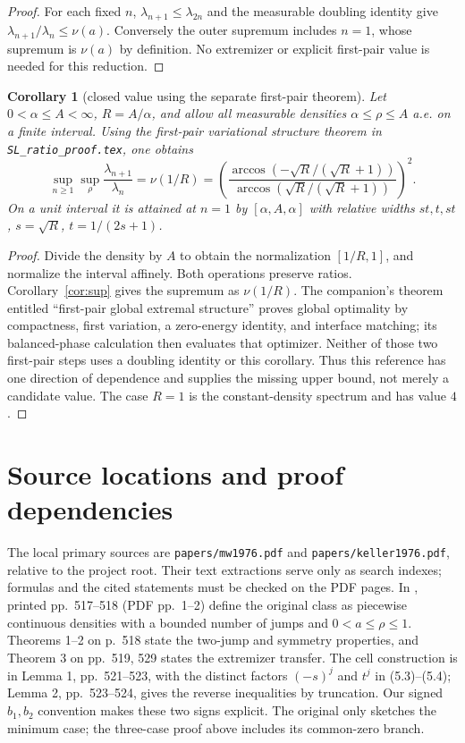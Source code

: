 ﻿\documentclass[11pt]{article}
\newtheorem{corollary}[theorem]{Corollary}
\begin{document}
\begin{proof}
 For each fixed $n$, $\lambda_{n+1}\le\lambda_{2n}$ and the measurable
 doubling identity give $\lambda_{n+1}/\lambda_n\le\nu(a)$.
 Conversely the outer supremum includes $n=1$, whose supremum is
 $\nu(a)$ by definition. No extremizer or explicit first-pair value is
 needed for this reduction.
\end{proof}

\begin{corollary}[closed value using the separate first-pair theorem]\label{cor:closed}
 Let $0<\alpha\le A<\infty$, $R=A/\alpha$, and allow all measurable
 densities $\alpha\le\rho\le A$ a.e. on a finite interval.
 Using the first-pair variational structure theorem in
 \texttt{SL\_ratio\_proof.tex}, one obtains
 \[
 \sup_{n\ge1}\sup_\rho\frac{\lambda_{n+1}}{\lambda_n}
 =\nu(1/R)
 =\left(\frac{\arccos(-\sqrt R/(\sqrt R+1))}
 {\arccos(\sqrt R/(\sqrt R+1))}\right)^2.
 \]
 On a unit interval it is attained at $n=1$ by $[\alpha,A,\alpha]$
 with relative widths $st,t,st$, $s=\sqrt R$, $t=1/(2s+1)$.
\end{corollary}

\begin{proof}
 Divide the density by $A$ to obtain the normalization $[1/R,1]$,
 and normalize the interval affinely. Both operations preserve ratios.
 Corollary~\ref{cor:sup} gives the supremum as $\nu(1/R)$.
 The companion's theorem entitled ``first-pair global extremal
 structure'' proves global optimality by compactness, first variation,
 a zero-energy identity, and interface matching; its balanced-phase
 calculation then evaluates that optimizer. Neither of those two
 first-pair steps uses a doubling identity or this corollary.
 Thus this reference has one direction of dependence and supplies the
 missing upper bound, not merely a candidate value.
 The case $R=1$ is the constant-density spectrum and has value $4$.
\end{proof}

\section{Source locations and proof dependencies}

The local primary sources are \texttt{papers/mw1976.pdf} and
\texttt{papers/keller1976.pdf}, relative to the project root. Their text
extractions serve only as search indexes; formulas and the cited
statements must be checked on the PDF pages. In \cite{mw}, printed
pp.~517--518 (PDF pp.~1--2) define the original class as piecewise
continuous densities with a bounded number of jumps and
$0<a\le\rho\le1$. Theorems 1--2 on p.~518 state the two-jump and symmetry
properties, and Theorem 3 on pp.~519, 529 states the extremizer transfer.
The cell construction is in Lemma 1, pp.~521--523, with the distinct
factors $(-s)^j$ and $t^j$ in (5.3)--(5.4); Lemma 2, pp.~523--524, gives
the reverse inequalities by truncation. Our signed $b_1,b_2$ convention
makes these two signs explicit. The original only sketches the minimum
case; the three-case proof above includes its common-zero branch.
\end{document}
